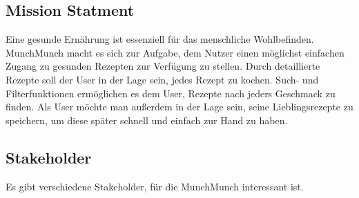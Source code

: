 \documentclass[conference,a4paper,flushend]{cs-techrep}
\begin{document}
\subsection{Mission Statment}
Eine gesunde Ernährung ist essenziell für das menschliche Wohlbefinden. MunchMunch macht es sich zur Aufgabe, dem Nutzer einen möglichst einfachen Zugang zu gesunden Rezepten zur Verfügung zu stellen. Durch detaillierte Rezepte soll der User in der Lage sein, jedes Rezept zu kochen. Such- und Filterfunktionen ermöglichen es dem User, Rezepte nach jeders Geschmack zu finden. Als User möchte man außerdem in der Lage sein, seine Lieblingsrezepte zu speichern, um diese später schnell und einfach zur Hand zu haben.
\subsection{Stakeholder}
Es gibt verschiedene Stakeholder, für die MunchMunch interessant ist.  
\end{document}
